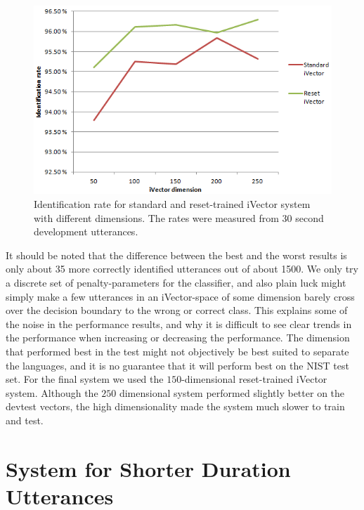 \begin{figure}[hbt!]
	\begin{center}
	\includegraphics[width=\textwidth]{figures/dimidentification.png}
	\caption{Identification rate for standard and reset-trained iVector system with different dimensions. The rates were measured from 30 second development utterances.}
	\label{fig:dimidrate}
	\end{center}
\end{figure}

It should be noted that the difference between the best and the worst results is only about 35 more correctly identified utterances out of about 1500. We only try a discrete set of penalty-parameters for the classifier, and also plain luck might simply make a few utterances in an iVector-space of some dimension barely cross over the decision boundary to the wrong or correct class. This explains some of the noise in the performance results, and why it is difficult to see clear trends in the performance when increasing or decreasing the performance. The dimension that performed best in the test might not objectively be best suited to separate the languages, and it is no guarantee that it will perform best on the NIST test set. For the final system we used the $150$-dimensional reset-trained iVector system. Although the $250$ dimensional system performed slightly better on the devtest vectors, the high dimensionality made the system much slower to train and test. 

\section{System for Shorter Duration Utterances}
\label{sect:ivectshort}

